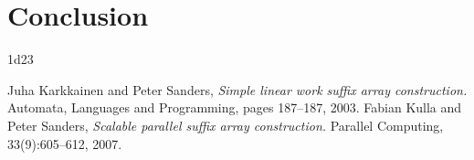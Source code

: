 \documentclass[a4paper,12pt]{article}
\begin{document}
\section{Conclusion}
1d23

\begin{thebibliography}{99}
Juha Karkkainen and Peter Sanders,
\emph{Simple linear work suffix array construction.}
Automata, Languages and Programming, pages 187–187, 2003.
Fabian Kulla and Peter Sanders,
\emph{Scalable parallel suffix array construction.}
Parallel Computing, 33(9):605–612, 2007.
\end{thebibliography}
\end{document}
